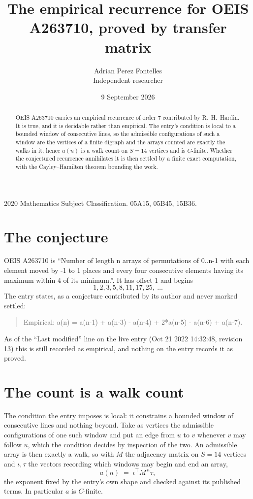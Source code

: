 \documentclass[11pt,a4paper]{article}
\title{The empirical recurrence for OEIS A263710, proved by transfer matrix}
\author{Adrian Perez Fontelles\\ \small Independent researcher}
\date{9 September 2026}
\theoremstyle{plain}
\theoremstyle{definition}
\begin{document}
\maketitle

\begin{abstract}
OEIS A263710 carries an empirical recurrence of order $7$ contributed by R.~H.~Hardin. It is
true, and it is decidable rather than empirical. The entry's condition is local to a bounded window of consecutive lines, so
the admissible configurations of such a window are the vertices of a finite digraph and the
arrays counted are exactly the walks in it; hence $a(n)$ is a walk count on $S=14$ vertices
and is $C$-finite. Whether the conjectured recurrence annihilates it is then settled by a
finite exact computation, with the Cayley--Hamilton theorem bounding the work.
\end{abstract}

\noindent\small 2020 Mathematics Subject Classification. 05A15, 05B45, 15B36.\normalsize

\section{The conjecture}

OEIS A263710 is ``Number of length n arrays of permutations of 0..n-1 with each element moved by -1 to 1 places and every four consecutive elements having its maximum within 4 of its minimum.''. It has offset $1$ and begins
\[
1, 2, 3, 5, 8, 11, 17, 25,\ \dots
\]
The entry states, as a conjecture contributed by its author and never marked settled:
\begin{quote}
Empirical: a(n) = a(n-1) + a(n-3) - a(n-4) + 2*a(n-5) - a(n-6) + a(n-7).
\end{quote}
As of the ``Last modified'' line on the live entry (Oct 21 2022 14:32:48, revision 13) this is still
recorded as empirical, and nothing on the entry records it as proved.

\section{The count is a walk count}

The condition the entry imposes is local: it constrains a bounded window of consecutive lines and nothing beyond. Take as
vertices the admissible configurations of one such window and put an edge from $u$ to $v$
whenever $v$ may follow $u$, which the condition decides by inspection of the two. An
admissible array is then exactly a walk, so with $M$ the adjacency matrix on $S=14$ vertices
and $\iota,\tau$ the vectors recording which windows may begin and end an array,
\[
a(n)\;=\;\iota^{\!\top}M^{\,n}\tau ,
\]
the exponent fixed by the entry's own shape and checked against its published terms. In
particular $a$ is $C$-finite.
\end{document}
